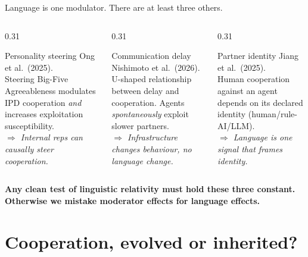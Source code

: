 \documentclass[11pt,aspectratio=169]{beamer}
\newcommand{\takeaway}[1]{%
  \begin{center}
    \colorbox{rsnavy!10}{%
      \begin{minipage}{0.92\textwidth}
        \centering\textbf{#1}
      \end{minipage}}
  \end{center}}
\begin{document}
\begin{frame}{Language is one modulator. There are at least three others.}
    \large
    \begin{columns}[T]
        \begin{column}{0.31\textwidth}
            \begin{block}{Personality steering}
                \footnotesize Ong et al.\ (2025).\\
                Steering Big-Five Agreeableness modulates IPD cooperation \emph{and} increases exploitation susceptibility.\\[4pt]
                \textit{$\Rightarrow$ Internal reps can causally steer cooperation.}
            \end{block}
        \end{column}
        \begin{column}{0.31\textwidth}
            \begin{block}{Communication delay}
                \footnotesize Nishimoto et al.\ (2026).\\
                U-shaped relationship between delay and cooperation. Agents \emph{spontaneously} exploit slower partners.\\[4pt]
                \textit{$\Rightarrow$ Infrastructure changes behaviour, no language change.}
            \end{block}
        \end{column}
        \begin{column}{0.31\textwidth}
            \begin{block}{Partner identity}
                \footnotesize Jiang et al.\ (2025).\\
                Human cooperation against an agent depends on its declared identity (human/rule-AI/LLM).\\[4pt]
                \textit{$\Rightarrow$ Language is one signal that frames identity.}
            \end{block}
        \end{column}
    \end{columns}
    \vspace{0.4cm}
    \takeaway{Any clean test of linguistic relativity must hold these three constant. Otherwise we mistake moderator effects for language effects.}
\end{frame}

\section{Cooperation, evolved or inherited?}
\end{document}
